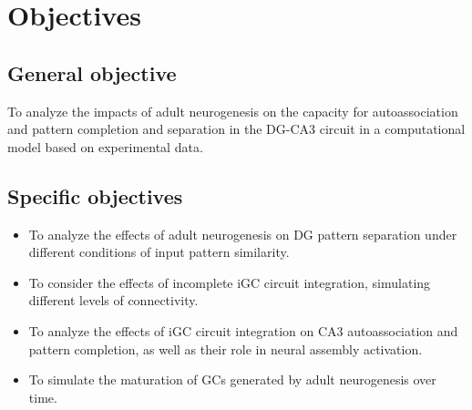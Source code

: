 \chapter{Objectives}

\section{General objective}

To analyze the impacts of adult neurogenesis on the capacity for autoassociation and pattern completion and separation in the
DG-CA3 circuit in a computational model based on experimental data.

\section{Specific objectives}

\begin{itemize}
    \item To analyze the effects of adult neurogenesis on DG pattern separation under different conditions of input pattern
    similarity.
    \item To consider the effects of incomplete iGC circuit integration, simulating different levels of connectivity.
    \item To analyze the effects of iGC circuit integration on CA3 autoassociation and pattern completion, as well as their role
    in neural assembly activation.
    \item To simulate the maturation of GCs generated by adult neurogenesis over time.
\end{itemize}
